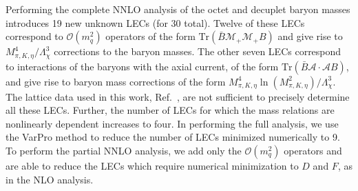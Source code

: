 \documentclass[twocolumn,nofootinbib,prd,aps,superscriptaddress,tightenlines]{revtex4}
\def\Tr{\textrm{Tr}}
\def\mc#1{{\mathcal{#1}}}
\def\L{\Lambda}
\begin{document}
Performing the complete NNLO analysis of the octet and decuplet baryon masses introduces 19 new unknown LECs (for 30 total).  Twelve of these LECs correspond to $\mc{O}(m_q^2)$ operators of the form $\Tr ( \bar{B} \mc{M}_+ \mc{M}_+ B)$ and give rise to $M_{\pi,K,\eta}^4/\L_\chi^3$ corrections to the baryon masses.  The other seven LECs correspond to interactions of the baryons with the axial current, of the form $\Tr ( \bar{B} \mc{A} \cdot \mc{A} B)$, and give rise to baryon mass corrections of the form $M_{\pi,K,\eta}^4 \ln (M_{\pi,K,\eta}^2) /\L_\chi^3$.  The lattice data used in this work, Ref.~\cite{WalkerLoud:2008bp}, are not sufficient to precisely determine all these LECs.  Further, the number of LECs for which the mass relations are nonlinearly dependent increases to four.  In performing the full analysis, we use the VarPro method to reduce the number of LECs minimized numerically to 9.  To perform the partial NNLO analysis, we add only the $\mc{O}(m_q^2)$ operators and are able to reduce the LECs which require numerical minimization to $D$ and $F$, as in the NLO analysis.  
\end{document}
